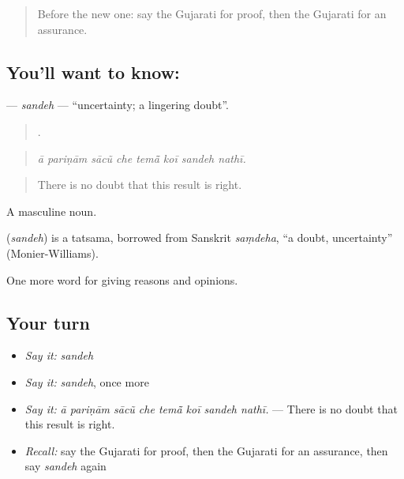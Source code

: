 \label{lesson:GU-C344-sandeh}



\begin{quote}
Before the new one: say the Gujarati for proof, then the Gujarati for an assurance.
\end{quote}

\subsection*{You'll want to know: }
\textbf{} — \emph{sandeh} — \textquotedblleft{}uncertainty; a lingering doubt\textquotedblright{}.

\begin{quote}
       .
\end{quote}

\begin{quote}
\emph{ā pariṇām sācũ che temā̃ koī sandeh nathī.}
\end{quote}

\begin{quote}
There is no doubt that this result is right.
\end{quote}

A masculine noun.

\begin{cousinweb}
\textbf{} (\emph{sandeh}) is a tatsama, borrowed from Sanskrit \emph{saṃdeha}, \textquotedblleft{}a doubt, uncertainty\textquotedblright{} (Monier-Williams).
\end{cousinweb}

\begin{grammarlens}[title={What you've built}]
One more word for giving reasons and opinions.
\end{grammarlens}

\subsection*{Your turn}
\begin{itemize}
\raggedright
  \item \emph{Say it:} \emph{sandeh}
  \item \emph{Say it:} \emph{sandeh}, once more
  \item \emph{Say it:} \emph{ā pariṇām sācũ che temā̃ koī sandeh nathī.} — There is no doubt that this result is right.
  \item \emph{Recall:} say the Gujarati for proof, then the Gujarati for an assurance, then say \emph{sandeh} again
\end{itemize}

